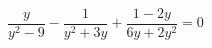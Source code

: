 \begin{ex}[type=equation]
	\begin{condition}
		$\dfrac{y}{y^2 - 9}-\dfrac{1}{y^2  + 3y } + \dfrac{1 - 2y}{6y + 2y^2}  = 0$
	\end{condition}
\end{ex}